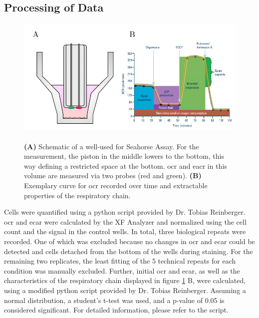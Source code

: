     \subsection{Processing of Data}
    \begin{figure}[h]
    \capstart
        \centering
        \includegraphics{Abbildung/seahorse_basics_placeholder.pdf}

        \begin{minipage}{\captionwidth}
            \caption[enrichment]{\\
            \textbf{(A)} Schematic of a well-used for Seahorse Assay. For the measurement, the piston in the middle lowers to the bottom, this way defining a restricted space at the bottom. \ac{ocr} and \ac{eacr} in this volume are measured via two probes (red and green). \textbf{(B)} Exemplary curve for \ac{ocr} recorded over time and extractable properties of the respiratory chain.}
            \label{fig:seahorse_basics}
        \end{minipage}
    \end{figure}

    Cells were quantified using a python script provided by Dr. Tobias Reinberger. \ac{ocr} and \ac{ecar} were calculated by the XF Analyzer and normalized using the cell count and the signal in the control wells. In total, three biological repeats were recorded. One of which was excluded because no changes in \ac{ocr} and \ac{ecar} could be detected and cells detached from the bottom of the wells during staining. For the remaining two replicates, the least fitting of the 5 technical repeats for each condition was manually excluded. Further, initial \ac{ocr} and \ac{ecar}, as well as the characteristics of the respiratory chain displayed in figure \ref{fig:seahorse_basics} B, were calculated, using a modified python script provided by Dr. Tobias Reinberger. Assuming a normal distribution, a student's t-test was used, and a p-value of 0.05 is considered significant. For detailed information, please refer to the script.

